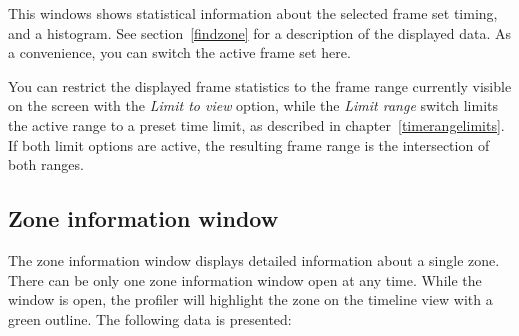 \documentclass[hidelinks,titlepage,a4paper,twoside]{article}
\begin{document}
This windows shows statistical information about the selected frame set timing, and a histogram. See section~\ref{findzone} for a description of the displayed data. As a convenience, you can switch the active frame set here.

You can restrict the displayed frame statistics to the frame range currently visible on the screen with the \emph{Limit to view} option, while the \emph{Limit range} switch limits the active range to a preset time limit, as described in chapter~\ref{timerangelimits}. If both limit options are active, the resulting frame range is the intersection of both ranges.

\subsection{Zone information window}
\label{zoneinfo}

The zone information window displays detailed information about a single zone. There can be only one zone information window open at any time. While the window is open, the profiler will highlight the zone on the timeline view with a green outline. The following data is presented:
\end{document}
